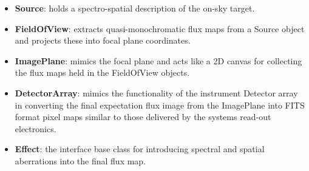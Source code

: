 \begin{itemize}
\item \textbf{Source}: holds a spectro-spatial description of the on-sky target.

\item \textbf{FieldOfView}: extracts quasi-monochromatic flux maps from a Source object and projects these into focal plane coordinates.

\item \textbf{ImagePlane}: mimics the focal plane and acts like a 2D canvas for collecting the flux maps held in the FieldOfView objects.

\item \textbf{DetectorArray}: mimics the functionality of the instrument Detector array in converting the final expectation flux image from the ImagePlane into FITS format pixel maps similar to those delivered by the systems read-out electronics.

\item \textbf{Effect}: the interface base class for introducing spectral and spatial aberrations into the final flux map.
\end{itemize}

